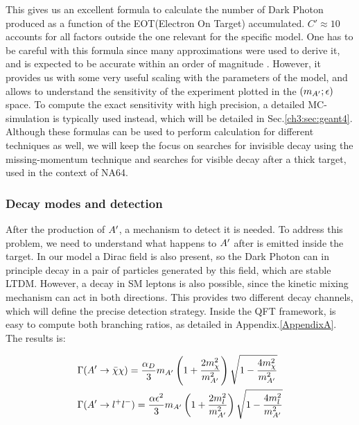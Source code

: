 This gives us an excellent formula to calculate the number of Dark Photon produced as a function of the EOT(Electron On Target) accumulated. $C' \approx 10$ accounts for all factors outside the one relevant for the specific model. One has to be careful with this formula since many approximations were used to derive it, and is expected to be accurate within an order of magnitude \cite{jdb}. However, it provides us with some very useful scaling with the parameters of the model, and allows to understand the sensitivity of the experiment plotted in the $(m_{A'};\epsilon)$ space. To compute the exact sensitivity with high precision, a detailed MC-simulation is typically used instead, which will be detailed in Sec.\ref{ch3:sec:geant4}. Although these formulas can be used to perform calculation for different techniques as well, we will keep the focus on searches for invisible decay using the missing-momentum technique and searches for visible decay after a thick target, used in the context of NA64.

\subsubsection{Decay modes and detection}
\label{ch1:sec:dm-decay}

After the production of $A'$, a mechanism to detect it is needed. To address this problem, we need to understand what happens to $A'$ after is emitted inside the target. In our model a Dirac field is also present, so the Dark Photon can in principle decay in a pair of particles generated by this field, which are stable LTDM. However, a decay in SM leptons is also possible, since the kinetic mixing mechanism can act in both directions. This provides two different decay channels, which will define the precise detection strategy. Inside the QFT framework, is easy to compute both branching ratios, as detailed in Appendix.\ref{AppendixA}. The results is:

\begin{equation}
  \label{eq:dm-bratio}
  \begin{aligned}
    &\Gamma(A' \to \bar{\chi} \chi) = \frac{\alpha_D}{3} m_{A'} \left( 1 + \frac{2m^2_{\chi}}{m_{A'}^2}\right) \sqrt{1 - \frac{4m_{\chi}^2}{m^2_{A'}}}\\
    &\Gamma(A' \to l^+l^-) = \frac{\alpha \epsilon^2}{3} m_{A'} \left( 1 + \frac{2m^2_{l}}{m_{A'}^2}\right) \sqrt{1 - \frac{4m_{l}^2}{m^2_{A'}}}
  \end{aligned}
\end{equation}

